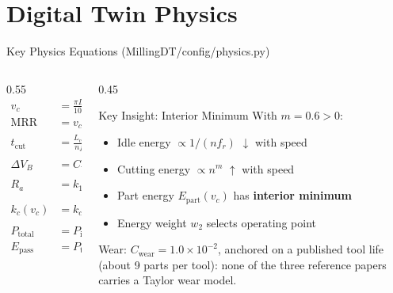 ﻿\documentclass[11pt,aspectratio=169]{beamer}
\newcommand{\MRR}{\mathrm{MRR}}
\newcommand{\Ra}{R_a}
\newcommand{\VB}{V_B}
\begin{document}
\section{Digital Twin Physics}

\begin{frame}{Key Physics Equations (MillingDT/config/physics.py)}
    \small
    \begin{columns}[T]
        \begin{column}{0.55\textwidth}
            \setlength{\jot}{2pt}
            \begin{align}
                v_c &= \frac{\pi D n}{1000} \\
                \MRR &= v_c \cdot a_p \cdot f_r \\
                t_{\text{cut}} &= \frac{L_{\text{cut}}}{n f_r} \\
                \Delta \VB &= C_{\text{wear}} v_c^{\alpha} f_r^{\beta} a_p^{\gamma} t_{\text{cut}} \\
                \Ra &= k_1 f_r^2 + k_2 \VB + \frac{k_3}{v_c} \\
                k_c(v_c) &= k_{c0} \left( \frac{v_c}{v_{\text{ref}}} \right)^m \\
                P_{\text{total}} &= P_{\text{idle}} + k_c(v_c) \cdot \MRR \\
                E_{\text{pass}} &= P_{\text{total}} \cdot t_{\text{cut}}
            \end{align}
        \end{column}
        \begin{column}{0.45\textwidth}
            \begin{alertblock}{Key Insight: Interior Minimum}
            With $m=0.6 > 0$:
            \begin{itemize}
                \item Idle energy $\propto 1/(n f_r)$ $\downarrow$ with speed
                \item Cutting energy $\propto n^m$ $\uparrow$ with speed
                \item Part energy $E_{\text{part}}(v_c)$ has \textbf{interior minimum}
                \item Energy weight $w_2$ selects operating point
            \end{itemize}
            \end{alertblock}
            \vspace{0.2em}
            {\scriptsize
            Wear: $C_{\text{wear}} = 1.0\times10^{-2}$, anchored on a published tool life (about 9
            parts per tool): none of the three reference papers carries a Taylor wear model.}
        \end{column}
    \end{columns}
\end{frame}
\end{document}
